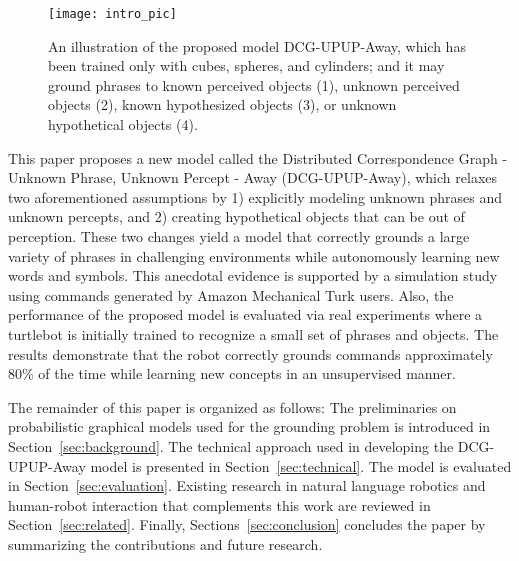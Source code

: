 \begin{figure}[t]
	\centering
	\texttt{[image: intro\_pic]}
	\caption{An illustration of the proposed model DCG-UPUP-Away, which has been trained only with cubes, spheres, and cylinders; and it may ground phrases to known perceived objects (1), unknown perceived objects (2), known hypothesized objects (3), or unknown hypothetical objects (4).}
	\label{fig:intro_pic}
\end{figure}

This paper proposes a new model called the Distributed Correspondence Graph - Unknown Phrase, Unknown Percept - Away (DCG-UPUP-Away), which relaxes two aforementioned assumptions by 1) explicitly modeling unknown phrases and unknown percepts, and 2) creating hypothetical objects that can be out of perception.
These two changes yield a model that correctly grounds a large variety of phrases in challenging environments while autonomously learning new words and symbols.
This anecdotal evidence is supported by a simulation study using commands generated by Amazon Mechanical Turk users.
Also, the performance of the proposed model is evaluated via real experiments where a turtlebot is initially trained to recognize a small set of phrases and objects. The results demonstrate that the robot correctly grounds commands approximately 80\% of the time while learning new concepts in an unsupervised manner.

The remainder of this paper is organized as follows:
The preliminaries on probabilistic graphical models used for the grounding problem is introduced in Section~\ref{sec:background}.
The technical approach used in developing the DCG-UPUP-Away model is presented in Section~\ref{sec:technical}.
The model is evaluated in Section~\ref{sec:evaluation}.
Existing research in natural language robotics and human-robot interaction that complements this work are reviewed in Section~\ref{sec:related}. Finally, Sections~\ref{sec:conclusion} concludes the paper by summarizing the contributions and future research.
